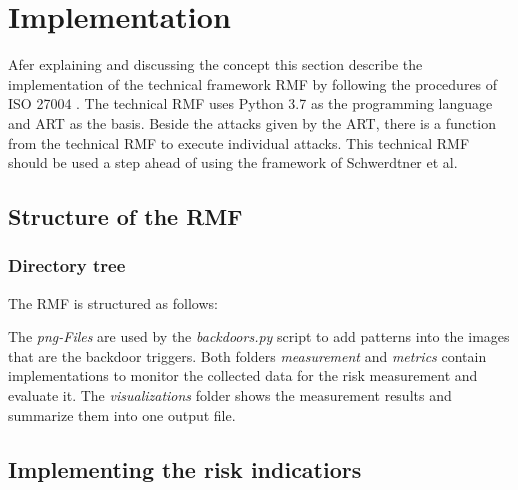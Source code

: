 \section{Implementation}
\label{sec:implementation}

Afer explaining and discussing the concept this section describe the implementation of the technical framework RMF by following the procedures of ISO 27004 \cite{ISO_27004_2009}. The technical RMF uses Python 3.7 as the programming language and ART as the basis. Beside the attacks given by the ART, there is a function from the technical RMF to execute individual attacks. This technical RMF should be used a step ahead of using the framework of Schwerdtner et al.

\subsection{Structure of the RMF}

\subsubsection*{Directory tree}

The RMF is structured as follows: \\


\break \noindent The \textit{png-Files} are used by the \textit{backdoors.py} script to add patterns into the images that are the backdoor triggers. Both folders \textit{measurement} and \textit{metrics} contain implementations to monitor the collected data for the risk measurement and evaluate it. The \textit{visualizations} folder shows the measurement results and summarize them into one output file.

\subsection{Implementing the risk indicatiors}

